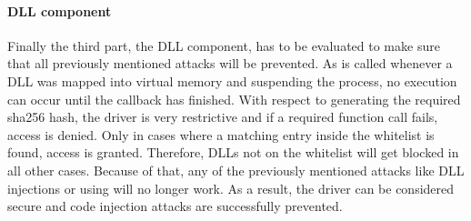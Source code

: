 \paragraph{\gls{DLL} component}
Finally the third part, the \gls{DLL} component, has to be evaluated to make sure that all previously mentioned attacks will be prevented. As  is called whenever a \gls{DLL} was mapped into virtual memory and suspending the process, no execution can occur until the callback has finished. With respect to generating the required sha256 hash, the driver is very restrictive and if a required function call fails, access is denied. Only in cases where a matching entry inside the whitelist is found, access is granted. Therefore, \glspl{DLL} not on the whitelist will get blocked in all other cases. Because of that, any of the previously mentioned attacks like \gls{DLL} injections or using  will no longer work. As a result, the driver can be considered secure and code injection attacks are successfully prevented.